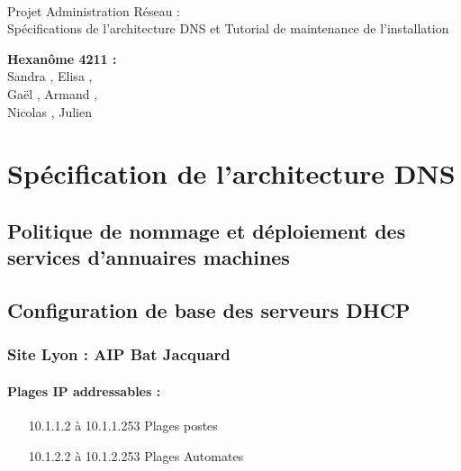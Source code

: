 \documentclass[a4paper]{article}
\begin{document}
\begin{titlepage}
	~ 
	\vfill
	\begin{center}
		\begin{Huge}
			Projet Administration Réseau : \\ Spécifications de l'architecture DNS et Tutorial de maintenance de l'installation\\
		\end{Huge}
	\vfill
		\textbf{Hexanôme 4211 :} 
			\\Sandra {}, Elisa , 
			\\Gaël , Armand , 
			\\Nicolas {}, Julien \\
	\vfill
	\end{center}
	\vfill
\end{titlepage}

\newpage
\tableofcontents
\newpage

\section{Spécification de l'architecture DNS}

\subsection{Politique de nommage et déploiement des services d'annuaires machines }



\subsection{Configuration de base des serveurs DHCP}

\subsubsection{Site Lyon : AIP Bat Jacquard }

\paragraph{Plages IP addressables :} 
\begin{itemize}
\item[10.1.1.2 à 10.1.1.253] Plages postes
\item[10.1.2.2 à 10.1.2.253] Plages Automates
\end{itemize}
\end{document}
